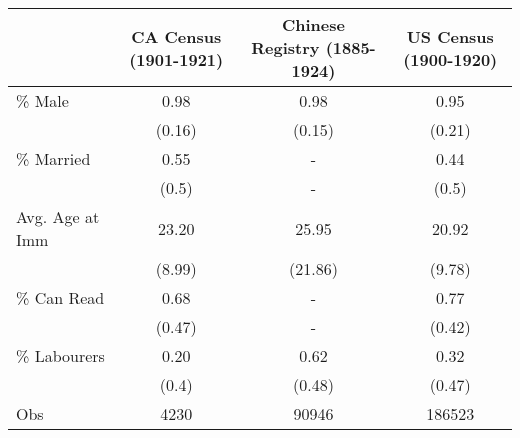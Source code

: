 \begin{tabular}{lccc}
  \hline
 & CA Census (1901-1921) & Chinese Registry (1885-1924) & US Census (1900-1920) \\ 
  \hline
\% Male & 0.98 & 0.98 & 0.95 \\ 
   & (0.16) & (0.15) & (0.21) \\ 
  \% Married & 0.55 & - & 0.44 \\ 
    & (0.5) & - & (0.5) \\ 
  Avg. Age at Imm & 23.20 & 25.95 & 20.92 \\ 
     & (8.99) & (21.86) & (9.78) \\ 
  \% Can Read & 0.68 & - & 0.77 \\ 
        & (0.47) & - & (0.42) \\ 
  \% Labourers & 0.20 & 0.62 & 0.32 \\ 
           & (0.4) & (0.48) & (0.47) \\ 
   \hline
Obs &   4230 &  90946 & 186523 \\ 
   \hline
\end{tabular}
